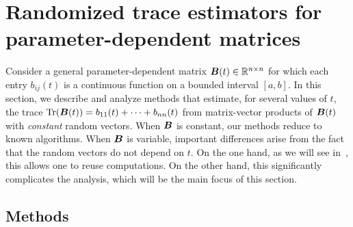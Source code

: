 \section{Randomized trace estimators for parameter-dependent matrices}
\label{sec:analysis}

Consider a general parameter-dependent matrix
$\boldsymbol{B}(t) \in \mathbb{R}^{n \times n}$ for which each
entry $b_{ij}(t)$ is a 
continuous function on a bounded interval $[a,b]$. In this section, we 
describe and analyze methods that estimate, for several values of $t$, the 
trace $\operatorname{Tr}(\boldsymbol{B}(t)) = b_{11}(t)+ \cdots + b_{nn}(t)$
from matrix-vector products of $\boldsymbol{B}(t)$ with \emph{constant} random vectors. When $\boldsymbol{B}$ is constant, our methods reduce to known algorithms. When $\boldsymbol{B}$ is variable, important differences arise from the fact that the random vectors do not depend on $t$. On the one hand, as we will see in~, this allows one to reuse computations. On the other hand, this significantly complicates the analysis, which will be the main focus of this section.

\subsection{Methods}
\label{subsec:methods}

